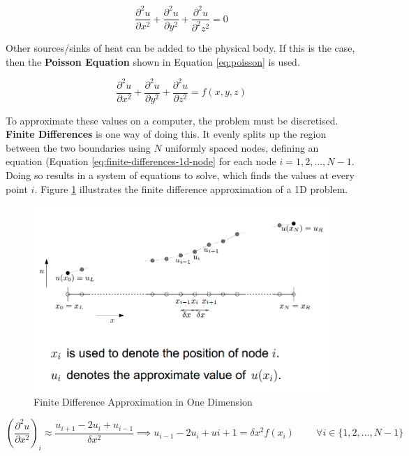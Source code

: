 \documentclass{article}
\begin{document}
\begin{equation}
	\frac{\partial^2 u}{\partial x^2} + \frac{\partial^2 u}{\partial y^2} + \frac{\partial^2 u}{\partial^2 z^2} = 0
	\label{eq:laplace}
\end{equation}

Other sources/sinks of heat can be added to the physical body. If this is the case, then the \textbf{Poisson Equation} shown in Equation \ref{eq:poisson} is used. 

\begin{equation}
	\frac{\partial^2 u}{\partial x^2} + \frac{\partial^2 u}{\partial y^2} + \frac{\partial^2 u}{\partial z^2} = f(x, y, z)
	\label{eq:poisson}
\end{equation}

To approximate these values on a computer, the problem must be discretised. \textbf{Finite Differences} is one way of doing this. It evenly splits up the region between the two boundaries using $N$ uniformly spaced nodes, defining an equation (Equation \ref{eq:finite-differences-1d-node} for each node $i = 1, 2, ..., N - 1$. Doing so results in a system of equations to solve, which finds the values at every point $i$. Figure \ref{fig:finite-differences} illustrates the finite difference approximation of a 1D problem.

\begin{figure}
	\centering
	\includegraphics[scale=0.35]{figures/1d-finite-differences.png}
	\caption{Finite Difference Approximation in One Dimension}
	\label{fig:finite-differences}
\end{figure}

\begin{equation}
	{\left( \frac{\partial^2 u}{\partial x^2}\right)}_i \approx \frac{u_{i+1} - 2u_i + u_{i - 1}}{\delta x^2} 
	\implies
	u_{i - 1} - 2u_i + u{i + 1} = \delta x^2 f(x_i)
	\;\;\;\;\;\;\;\; \forall 
	i \in \lbrace 1, 2, ..., N - 1 \rbrace
	\label{eq:finite-differences-1d-node}
\end{equation}
\end{document}
